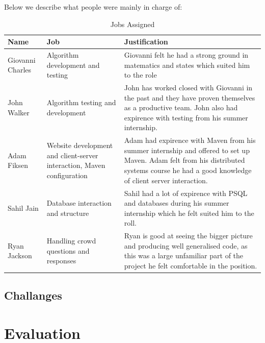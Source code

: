 \documentclass[11pt]{article}
\begin{document}
Below we describe what people were mainly in charge of:


\begin{table}[H]
\caption{Jobs Assigned}
\begin{center}
\begin{tabular}{|p{2cm}|p{5cm}|p{7cm}|}
Name & Job & Justification\\
\hline

Giovanni Charles & Algorithm development and testing                                       &
Giovanni felt he had a strong ground in matematics and states which suited him to the role
\\ 
John Walker      & Algorithm testing and development                                       &
John has worked closed with Giovanni in the past and they have proven themselves as a productive team.
John also had expirence with testing from his summer internship. 
\\
Adam Fiksen      & Website development and client-server interaction, Maven configuration  &
Adam had expirence with Maven from his summer internship and offered to set up Maven. Adam
felt from his distributed systems course he had a good knowledge of client server interaction.
\\
Sahil Jain       & Database interaction and structure                                      &
Sahil had a lot of expirence with PSQL and databases during his summer internship which he felt
suited him to the roll.
\\
Ryan Jackson     & Handling crowd questions and responses                                  &
Ryan is good at seeing the bigger picture and producing well generalised code, as this was a large
unfamiliar part of the project he felt comfortable in the position.
\\

\end{tabular}
\end{center}
\label{jobs}
\end{table}

\subsection{Challanges}

\section{Evaluation}
\end{document}
